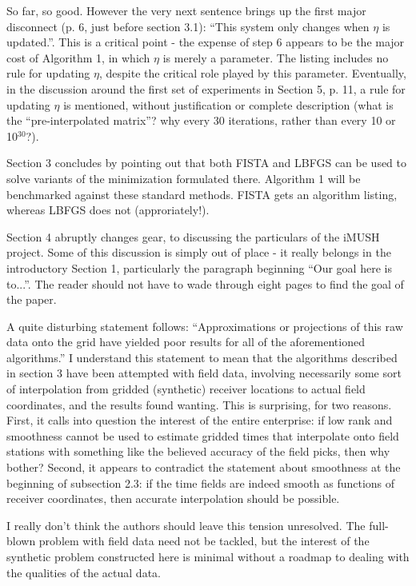 So far, so good. However the very next sentence brings up the first major disconnect (p. 6, just before section 3.1): ``This system only changes when $\eta$ is updated.''. This is a critical point - the expense of step 6 appears to be the major cost of Algorithm 1, in which $\eta$ is merely a parameter. The listing includes no rule for updating $\eta$, despite the critical role played by this parameter. Eventually, in the discussion around the first set of experiments in Section 5,  p. 11, a rule for updating $\eta$ is mentioned, without justification or complete description (what is the ``pre-interpolated matrix''? why every 30 iterations, rather than every 10 or 10$^{30}$?).

Section 3 concludes by pointing out that both FISTA and LBFGS can be used to solve variants of the minimization formulated there. Algorithm 1 will be benchmarked against these standard methods. FISTA gets an algorithm listing, whereas LBFGS does not (approriately!).

Section 4 abruptly changes gear, to discussing the particulars of the iMUSH project. Some of this discussion is simply out of place - it really belongs in the introductory Section 1, particularly the paragraph beginning ``Our goal here is to...''. The reader should not have to wade through eight pages to find the goal of the paper.

A quite disturbing statement follows: ``Approximations or projections of this raw data onto the grid have yielded poor results for all of the aforementioned algorithms.'' I understand this statement to mean that the algorithms described in section 3 have been attempted with field data, involving necessarily some sort of interpolation from gridded (synthetic) receiver locations to actual field coordinates, and the results found wanting. This is surprising, for two reasons. First, it calls into question the interest of the entire enterprise: if low rank and smoothness cannot be used to estimate gridded times that interpolate onto field stations with something like the believed accuracy of the field picks, then why bother? Second, it appears to contradict the statement about smoothness at the beginning of subsection 2.3: if the time fields are indeed smooth as functions of receiver coordinates, then accurate interpolation should be possible.

I really don't think the authors should leave this tension unresolved. The full-blown problem with field data need not be tackled, but the interest of the synthetic problem constructed here is minimal without a roadmap to dealing with the qualities of the actual data.

